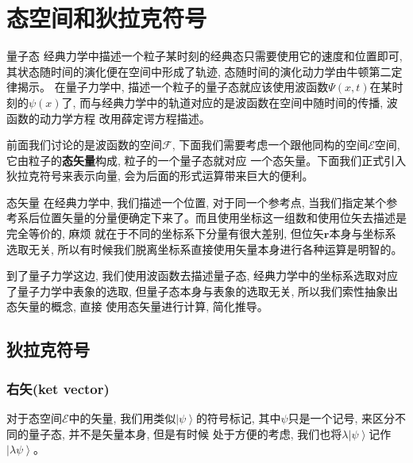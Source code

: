 \section{态空间和狄拉克符号}
\begin{proposition}{量子态}
    \setlength\parindent{2em}经典力学中描述一个粒子某时刻的经典态只需要使用它的速度和位置即可, 其状态随时间的演化便在空间中形成了轨迹, 态随时间的演化动力学由牛顿第二定律揭示。
    在量子力学中, 描述一个粒子的量子态就应该使用波函数$\Psi(x,t)$在某时刻的$\psi(x)$了, 而与经典力学中的轨道对应的是波函数在空间中随时间的传播, 波函数的动力学方程
    改用薛定谔方程描述。
\end{proposition}
前面我们讨论的是波函数的空间$\mathscr{F}$, 下面我们需要考虑一个跟他同构的空间$\mathscr{E}$空间, 它由粒子的\textbf{态矢量}构成, 粒子的一个量子态就对应
一个态矢量。下面我们正式引入狄拉克符号来表示向量, 会为后面的形式运算带来巨大的便利。
\begin{proposition}{态矢量}
    \setlength\parindent{2em}在经典力学中, 我们描述一个位置, 对于同一个参考点, 当我们指定某个参考系后位置矢量的分量便确定下来了。而且使用坐标这一组数和使用位矢去描述是完全等价的, 麻烦
    就在于不同的坐标系下分量有很大差别, 但位矢$\bm{r}$本身与坐标系选取无关, 所以有时候我们脱离坐标系直接使用矢量本身进行各种运算是明智的。


    \setlength\parindent{2em}到了量子力学这边, 我们使用波函数去描述量子态, 经典力学中的坐标系选取对应了量子力学中表象的选取, 但量子态本身与表象的选取无关, 所以我们索性抽象出态矢量的概念, 直接
    使用态矢量进行计算, 简化推导。
\end{proposition}
\subsection*{狄拉克符号}
\subsubsection*{右矢(ket vector)}
对于态空间$\mathscr{E}$中的矢量, 我们用类似$\left | \psi  \right \rangle $的符号标记, 其中$\psi$只是一个记号, 来区分不同的量子态, 并不是矢量本身, 但是有时候
处于方便的考虑, 我们也将$\lambda\left | \psi  \right \rangle $记作$\left | \lambda\psi  \right \rangle $。
